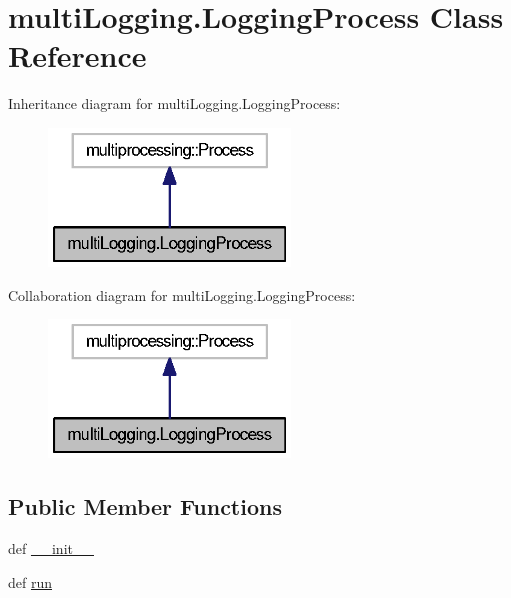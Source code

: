 \section{multi\-Logging.\-Logging\-Process Class Reference}
\label{classmultiLogging_1_1LoggingProcess}


Inheritance diagram for multi\-Logging.\-Logging\-Process\-:
\nopagebreak
\begin{figure}[H]
\begin{center}
\leavevmode
\includegraphics[width=182pt]{classmultiLogging_1_1LoggingProcess__inherit__graph}
\end{center}
\end{figure}


Collaboration diagram for multi\-Logging.\-Logging\-Process\-:
\nopagebreak
\begin{figure}[H]
\begin{center}
\leavevmode
\includegraphics[width=182pt]{classmultiLogging_1_1LoggingProcess__coll__graph}
\end{center}
\end{figure}
\subsection*{Public Member Functions}
\begin{DoxyCompactItemize}
\item 
def \hyperlink{classmultiLogging_1_1LoggingProcess_ae77ad9cb91d460d606d097af13927705}{\-\_\-\-\_\-init\-\_\-\-\_\-}
\item 
def \hyperlink{classmultiLogging_1_1LoggingProcess_aa01dec95826dabcc5fc1fb63ea97ea7a}{run}
\end{DoxyCompactItemize}
